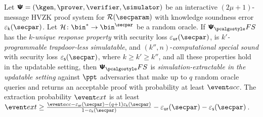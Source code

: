 
\begin{theorem}
	\label{thm:se}
	Let $\ps = (\kgen, \prover, \verifier, \simulator)$ be an interactive
	$(2 \mu + 1)$-message HVZK proof system for $\RELGEN(\secparam)$
	with knowledge soundness error $\epsk(\secpar)$. Let
	$\ro\colon \bin^{*} \to \bin^{\secpar}$ be a random oracle. If $\psfs$ has the
	$k$-\emph{unique response property} with security loss $\epsur(\secpar)$, is
	\emph{$k'$-programmable trapdoor-less simulatable}, and $(k'', n)$-\emph{computational
		special sound} with security loss $\epss(\secpar)$, where $k \geq k' \geq k''$, and all these properties
	hold in the updatable setting, then $\psfs$ is
	\emph{simulation-extractable in the updatable setting} against $\ppt$ adversaries that make up to $q$ random oracle
	queries and returns an acceptable proof with probability at least $\accProb$.  The
	extraction probability $\extProb$ is at least
	$\extProb \geq \frac{\accProb - \epsur(\secpar) - (q + 1) \epsk(\secpar)}{1 - \epsk(\secpar)} 
	- \epsur(\secpar) - \epss(\secpar)\,$.
\end{theorem}

